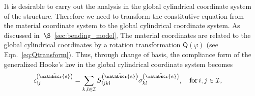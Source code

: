 \documentclass[preprint,10pt,times]{elsarticle}
\numberwithin{equation}{section}
\newcommand{\physe}{\hat{\mathbscr{e}}} %
\renewcommand{\u}[1]{\boldsymbol{#1}}
\newcommand{\usf}[1]{\u{\mathsf #1}}
\newcommand{\pr}[1]{\left( #1 \right)}
\renewcommand{\>}{$\Rightarrow$}
\begin{document}
It is desirable to carry out the analysis in the global cylindrical coordinate system of the structure.
Therefore we need to transform the constitutive equation from the material coordinate system to the global cylindrical coordinate system.
As discussed in~$\S$~\ref{sec:bending_model}, The material coordinates are related to the global cylindrical coordinates by a rotation transformation $\usf{Q}(\varphi)$ (see Eqn.~\eqref{eq:Qtransform}). Thus, through change of basis, the compliance form of the generalized Hooke's law in the global cylindrical coordinate system becomes
\begin{equation}
\epsilon_{ij}^{\pr{\physe}} = \sum_{k,l \in \mathcal{I}}  S_{ijkl}^{\pr{\physe}} \sigma_{kl}^{\pr{\physe}}, \quad \text{for} \,i,j \in \mathcal{I} ,
\label{eq:GeneralizedHookeComponentsGlobal}
\end{equation}
\end{document}
